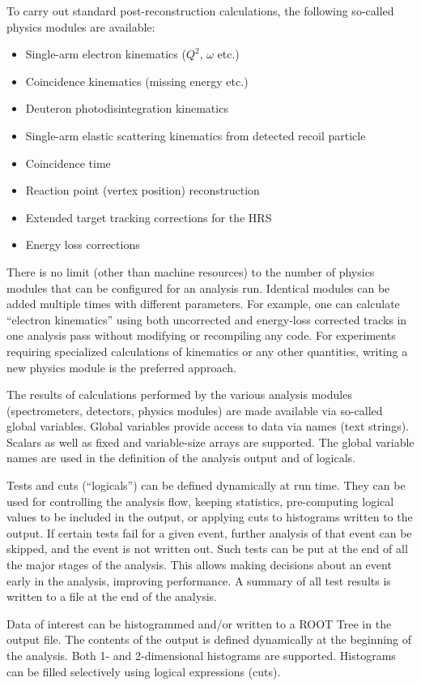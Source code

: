 {To carry out standard post-reconstruction calculations, the following
so-called physics modules are available:
\begin{itemize} \setlength{\parskip}{0ex}
  \item Single-arm electron kinematics ($Q^2$, $\omega$ etc.)
  \item Coincidence kinematics (missing energy etc.)
  \item Deuteron photodisintegration kinematics
  \item Single-arm elastic scattering kinematics from detected recoil
          particle 
  \item Coincidence time
  \item Reaction point (vertex position) reconstruction 
  \item Extended target tracking corrections for the HRS
  \item Energy loss corrections
\end{itemize}
There is no limit (other than machine resources) to the number of physics 
modules that can be configured for an analysis run.
Identical modules can be added multiple times with different parameters.
For example, one can calculate ``electron kinematics'' using both uncorrected
and energy-loss corrected tracks in one analysis pass without modifying
or recompiling any code. For experiments requiring
specialized calculations of kinematics or any other quantities,
writing a new physics module is the preferred approach. 

The results of calculations performed by the various analysis modules 
(spectrometers, detectors, physics modules) are made available via 
so-called global variables. 
Global variables provide access to data via names (text strings). 
Scalars as well as fixed and variable-size arrays are supported.
The global variable names are used in the definition of the analysis output
and of logicals. 

Tests and cuts (``logicals'') can be defined
dynamically at run time. They can be used for controlling the analysis flow,
keeping statistics, pre-computing logical values to be included in the output,
or applying cuts to histograms written to the output.
If certain tests fail for a given event, further analysis of that
event can be skipped, and the event is not written out.  Such tests
can be put at the end of all the major stages of the analysis.  This
allows making decisions about an event early in the analysis,
improving performance.  A summary of all test results is written to a
file at the end of the analysis.

Data of interest can be histogrammed and/or written to
a ROOT Tree in the output file.  The contents of the output
is defined dynamically at the beginning of the analysis.
Both 1- and 2-dimensional histograms are supported. Histograms
can be filled selectively using logical expressions (cuts).

} %

